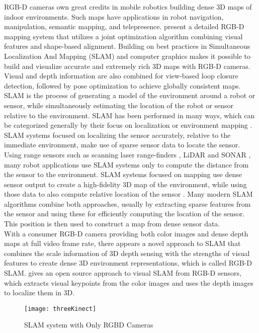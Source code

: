 RGB-D cameras own great credits in mobile robotics building dense 3D maps of indoor environments. Such maps have applications in robot navigation, manipulation, semantic mapping, and telepresence. \cite{indorMappingRGBD_2014} present a detailed RGB-D mapping system that utilizes a joint optimization algorithm combining visual features and shape-based alignment. Building on best practices in Simultaneous Localization And Mapping (SLAM) and computer graphics makes it possible to build and visualize accurate and extremely rich 3D maps with RGB-D cameras. Visual and depth information are also combined for view-based loop closure detection, followed by pose optimization to achieve globally consistent maps. SLAM is the process of generating a model of the environment around a robot or sensor, while simultaneously estimating the location of the robot or sensor relative to the environment. SLAM has been performed in many ways, which can be categorized generally by their focus on localization or environment mapping \cite{SLAMintro_2015}. SLAM systems focused on localizing the sensor accurately, relative to the immediate environment, make use of sparse sensor data to locate the sensor. Using range sensors such as scanning laser range-finders \cite{laserSLAM_2011}, LiDAR and SONAR \cite{sonarSLAM_2013}, many robot applications use SLAM systems only to compute the distance from the sensor to the environment. SLAM systems focused on mapping use dense sensor output to create a high-fidelity 3D map of the environment, while using those data to also compute relative location of the sensor \cite{KinectFusion_2011} \cite{mapSLAM_2013}. Many modern SLAM algorithms combine both approaches, usually by extracting sparse features from the sensor and using these for efficiently computing the location of the sensor. This position is then used to construct a map from dense sensor data. 
\\\indent
With a consumer RGB-D camera providing both color images and dense depth maps at full video frame rate, there appears a novel approach to SLAM that combines the scale information of 3D depth sensing with the strengths of visual features to create dense 3D environment representations, which is called RGB-D SLAM. \cite{RGBDSLAM01_2012} gives an open source approach to visual SLAM from RGB-D sensors, which extracts visual keypoints from the color images and uses the depth images to localize them in 3D. %
%
\begin{figure}[t]
\centering
\texttt{[image: threeKinect]}
\caption{SLAM system with Only RGBD Cameras \cite{RGBDSLAMsystem_2013}}
\label{threeKinect}
\end{figure}%
